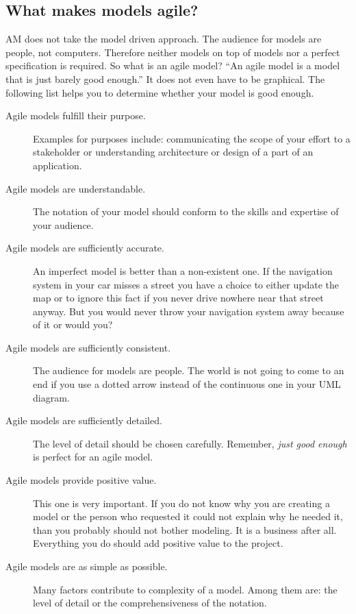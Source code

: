 \subsection{What makes models agile?}
AM does not take the model driven approach. The audience for models are people,
not computers. Therefore neither models on top of models nor a
perfect specification is required. So what is an agile model? \enquote{An agile
model is a model that is just barely good enough.}\cite{Ambler200204} It does
not even have to be graphical. The following list helps you to determine whether
your model is good enough.
\begin{description}
\item[Agile models fulfill their purpose.] Examples for purposes include:
communicating the scope of your effort to a stakeholder or understanding
architecture or design of a part of an application.
\item[Agile models are understandable.] The notation of your model should
conform to the skills and expertise of your audience.
\item[Agile models are sufficiently accurate.] An imperfect model is better than
a non-existent one. If the navigation system in your car misses a street you
have a choice to either update the map or to ignore this fact if you never drive
nowhere near that street anyway. But you would never throw your navigation
system away because of it or would you?
\item[Agile models are sufficiently consistent.] The audience for models are
people. The world is not going to come to an end if you use a dotted arrow
instead of the continuous one in your UML diagram.
\item[Agile models are sufficiently detailed.] The level of detail should be
chosen carefully. Remember, \emph{just good enough} is perfect for an agile
model.
\item[Agile models provide positive value.] This one is very important. If you
do not know why you are creating a model or the person who requested it could
not explain why he needed it, than you probably should not bother modeling. It
is a business after all. Everything you do should add positive value to the
project.
\item[Agile models are as simple as possible.] Many factors contribute to
complexity of a model. Among them are: the level of detail or
the comprehensiveness of the notation.
\end{description}















